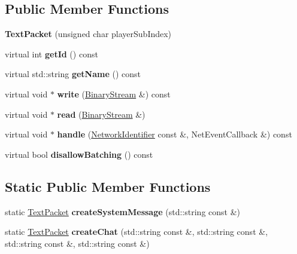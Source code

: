 \subsection*{Public Member Functions}
\begin{DoxyCompactItemize}
\item 
\mbox{\label{struct_text_packet_af8266837c559201af138a27a34f62f5f}} 
{\bfseries Text\+Packet} (unsigned char player\+Sub\+Index)
\item 
\mbox{\label{struct_text_packet_a3be09c982627b28c795f4e1ec296b7f3}} 
virtual int {\bfseries get\+Id} () const
\item 
\mbox{\label{struct_text_packet_a11e797b55efb9391d896c79163713795}} 
virtual std\+::string {\bfseries get\+Name} () const
\item 
\mbox{\label{struct_text_packet_a0d1e8773945bae3d0841d702368efcdf}} 
virtual void $\ast$ {\bfseries write} (\mbox{\hyperlink{struct_binary_stream}{Binary\+Stream}} \&) const
\item 
\mbox{\label{struct_text_packet_a9f0599b1d59bda8ba5f2a29cd901d804}} 
virtual void $\ast$ {\bfseries read} (\mbox{\hyperlink{struct_binary_stream}{Binary\+Stream}} \&)
\item 
\mbox{\label{struct_text_packet_a0a08c3a8a31e0a2283d73e9d43d522c0}} 
virtual void $\ast$ {\bfseries handle} (\mbox{\hyperlink{struct_network_identifier}{Network\+Identifier}} const \&, Net\+Event\+Callback \&) const
\item 
\mbox{\label{struct_text_packet_a812848db08c7097de0f7a1b07bd94fbd}} 
virtual bool {\bfseries disallow\+Batching} () const
\end{DoxyCompactItemize}
\subsection*{Static Public Member Functions}
\begin{DoxyCompactItemize}
\item 
\mbox{\label{struct_text_packet_a0f49f6b306b5a92b359da06c887c087c}} 
static \mbox{\hyperlink{struct_text_packet}{Text\+Packet}} {\bfseries create\+System\+Message} (std\+::string const \&)
\item 
\mbox{\label{struct_text_packet_a22e70978f9d68eee1f39e802cf4b4670}} 
static \mbox{\hyperlink{struct_text_packet}{Text\+Packet}} {\bfseries create\+Chat} (std\+::string const \&, std\+::string const \&, std\+::string const \&, std\+::string const \&)
\end{DoxyCompactItemize}
